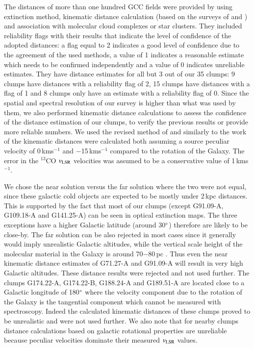 \documentclass[printer]{aa}
\begin{document}
The distances of more than one hundred GCC fields were provided by \citet{montillaud2015} using extinction method, kinematic distance calculation (based on the surveys of \citet{dame2001} and \citet{wu2012}) and association with molecular cloud complexes or star clusters. They included reliability flags with their results that indicate the level of confidence of the adopted distances: a flag equal to 2 indicates a good level of confidence due to the agreement of the used methods, a value of 1 indicates a reasonable estimate which needs to be confirmed independently and a value of 0 indicates unreliable estimates. They have distance estimates for all but 3 out of our 35 clumps: 9 clumps have distances with a reliability flag of 2, 15 clumps have distances with a flag of 1 and 8 clumps only have an estimate with a reliability flag of 0. Since the spatial and spectral resolution of our survey is higher than what was used by them, we also performed kinematic distance calculations to assess the confidence of the distance estimation of our clumps, to verify the previous results or provide more reliable numbers. We used the revised method of \citet{reid2009} and similarly to the work of \citet{montillaud2015} the kinematic distances were calculated both assuming a source peculiar velocity of 0\,kms$^{-1}$ and $-$15\,kms$^{-1}$ compared to the rotation of the Galaxy. The error in the $^{13}$CO $v_{\rm LSR}$ velocities was assumed to be a conservative value of 1\,kms$^{-1}$.

We chose the near solution versus the far solution where the two were not equal, since these galactic cold objects are expected to be mostly under 2\,kpc distances. This is supported by the fact that most of our clumps (except G91.09-A, G109.18-A and G141.25-A) can be seen in optical extinction maps. The three exceptions have a higher Galactic latitude (around 30$\degree$) therefore are likely to be close-by. The far solution can be also rejected in most cases since it generally would imply unrealistic Galactic altitudes, while the vertical scale height of the molecular material in the Galaxy is around 70$-$80\,pc \citep{bronfman1988, clemens1988}. Thus even the near kinematic distance estimates of G71.27-A and G91.09-A will result in very high Galactic altitudes. These distance results were rejected and not used further. The clumps G174.22-A, G174.22-B, G188.24-A and G189.51-A are located close to a Galactic longitude of 180$\degree$ where the velocity component due to the rotation of the Galaxy is the tangential component which cannot be measured with spectroscopy. Indeed the calculated kinematic distances of these clumps proved to be unrealistic and were not used further. We also note that for nearby clumps distance calculations based on galactic rotational properties are unreliable because peculiar velocities dominate their measured $v_{\rm LSR}$ values.
\end{document}
